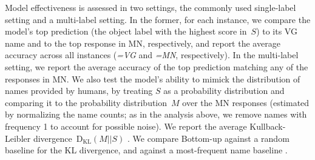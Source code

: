 Model effectiveness is assessed in two settings, the commonly used single-label setting and a multi-label setting. 
In the former, for each instance, we compare the model's top prediction (the object label with the highest score in\ $S$) to its VG name and to the top response in MN, respectively, and report the average accuracy across all instances (\textit{=VG} and \textit{=MN}, respectively).
In the multi-label setting, we report the average accuracy of the top prediction matching any of the responses in MN.
We also test the model's ability to mimick the distribution of names provided by humans, by treating $S$ as a probability distribution and comparing it to the probability distribution~$M$ over the MN responses (estimated by normalizing the name counts; as in the analysis above, we remove names with frequency 1 to account for possible noise). 
We report the average Kullback-Leibler divergence~$\mathrm{D_{KL}}(M||S)$ \cite{kullback1951information}.
We compare Bottom-up against a random baseline for the KL divergence, and against a most-frequent name baseline .

\iffalse
\textsl{top}: the model's top prediction
\begin{itemize}
	\item \textbf{=VG} The average model accuracy of \textsl{top} on the VG names
	\item \textbf{=MN} The average model accuracy of \textsl{top} on the top response in ManyNames
	\item \textbf{$\in$MN} The average model accuracy of \textsl{top} to match any name of the responses in ManyNames
	\item \textbf{KL} The average Kullback-Leibler divergence~$\mathrm{D_{KL}}(M||S)$ of the model's softmax output~$S$ and the  probability distribution~$M$ over ManyNames, estimated by normalizing the name counts per instance
\end{itemize}
\fi

